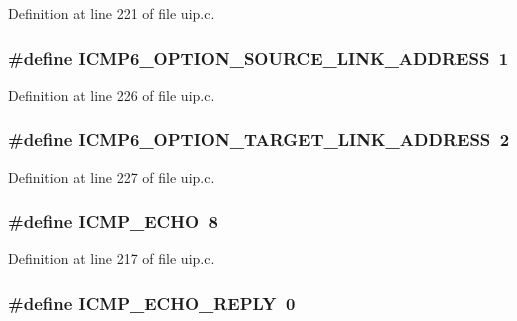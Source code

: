 Definition at line 221 of file uip.c.

\hypertarget{group__uip_ga42288d5c3cf4b10becefec657f441e54}{
\subsubsection[{ICMP6\_\-OPTION\_\-SOURCE\_\-LINK\_\-ADDRESS}]{\setlength{\rightskip}{0pt plus 5cm}\#define ICMP6\_\-OPTION\_\-SOURCE\_\-LINK\_\-ADDRESS~1}}
\label{group__uip_ga42288d5c3cf4b10becefec657f441e54}


Definition at line 226 of file uip.c.

\hypertarget{group__uip_ga8387881de3a8bfd3c0d57b9d04ac9b7e}{
\subsubsection[{ICMP6\_\-OPTION\_\-TARGET\_\-LINK\_\-ADDRESS}]{\setlength{\rightskip}{0pt plus 5cm}\#define ICMP6\_\-OPTION\_\-TARGET\_\-LINK\_\-ADDRESS~2}}
\label{group__uip_ga8387881de3a8bfd3c0d57b9d04ac9b7e}


Definition at line 227 of file uip.c.

\hypertarget{group__uip_gad58231410d58e34b455328b888a9e73c}{
\subsubsection[{ICMP\_\-ECHO}]{\setlength{\rightskip}{0pt plus 5cm}\#define ICMP\_\-ECHO~8}}
\label{group__uip_gad58231410d58e34b455328b888a9e73c}


Definition at line 217 of file uip.c.

\hypertarget{group__uip_ga5c5b1834e497f53ad0ef947bbe9777fa}{
\subsubsection[{ICMP\_\-ECHO\_\-REPLY}]{\setlength{\rightskip}{0pt plus 5cm}\#define ICMP\_\-ECHO\_\-REPLY~0}}
\label{group__uip_ga5c5b1834e497f53ad0ef947bbe9777fa}


